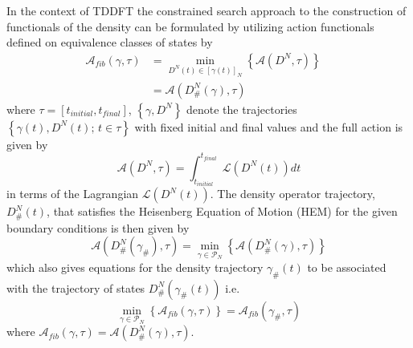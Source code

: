 \documentclass[aps,preprint]{revtex4}%
\begin{document}
In the context of TDDFT the constrained search approach to the construction of
functionals of the density can be formulated by utilizing action functionals
defined on equivalence classes of states by
\begin{align}
\mathcal{A}_{fib}\left(  \gamma,\tau\right)   &  =\min_{D^{N}\left(  t\right)
\in\left[  \gamma\left(  t\right)  \right]  _{N}}\left\{  \mathcal{A}\left(
D^{N},\tau\right)  \right\}  \quad\nonumber\\
&  =\mathcal{A}\left(  D_{\#}^{N}\left(  \gamma\right)  ,\tau\right)
\label{restact}%
\end{align}
where $\tau=\left[  t_{initial},t_{final}\right]  $, $\left\{  \gamma
,D^{N}\right\}  $ denote the trajectories $\left\{  \gamma\left(  t\right)
,D^{N}\left(  t\right)  ;\,t\in\tau\right\}  $ with fixed initial and final
values and the full action is given by
\begin{equation}
\mathcal{A}\left(  D^{N},\tau\right)  =\int_{t_{initial}}^{t_{final}%
}\mathcal{L}\left(  D^{N}\left(  t\right)  \right)  dt
\end{equation}
in terms of the Lagrangian $\mathcal{L}\left(  D^{N}\left(  t\right)  \right)
$. The density operator trajectory, $D_{\#}^{N}\left(  t\right)  $, that
satisfies the Heisenberg Equation of Motion (HEM) for the given boundary
conditions is then given by
\begin{equation}
\mathcal{A}\left(  D_{\#}^{N}\left(  \gamma_{\#}\right)  ,\tau\right)
=\min_{\gamma\in\mathcal{P}_{N}}\left\{  \mathcal{A}\left(  D_{\#}^{N}\left(
\gamma\right)  ,\tau\right)  \right\}
\end{equation}
which also gives equations for the density trajectory $\gamma_{\#}\left(
t\right)  $ to be associated with the trajectory of states $D_{\#}^{N}\left(
\gamma_{\#}\left(  t\right)  \right)  $ i.e.
\begin{equation}
\min_{\gamma\in\mathcal{P}_{N}}\left\{  \mathcal{A}_{fib}\left(  \gamma
,\tau\right)  \right\}  =\mathcal{A}_{fib}\left(  \gamma_{\#},\tau\right)
\end{equation}
where $\mathcal{A}_{fib}\left(  \gamma,\tau\right)  =\mathcal{A}\left(
D_{\#}^{N}\left(  \gamma\right)  ,\tau\right)  $.
\end{document}
